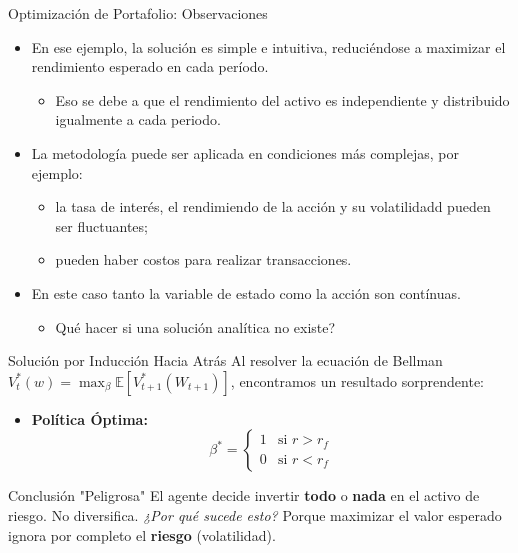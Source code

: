 \documentclass[xcolor=dvipsnames]{beamer}
\begin{document}
\begin{frame}{Optimización de Portafolio: Observaciones}
\begin{itemize}
\item En ese ejemplo, la solución es simple e intuitiva, reduciéndose a maximizar el rendimiento esperado en cada período. 
\begin{itemize}
\item<2-> Eso se debe a que el rendimiento del activo es independiente y distribuido igualmente a cada periodo.
\end{itemize}
\item<3-> La metodología puede ser aplicada en condiciones más complejas, por ejemplo:
\begin{itemize} 
\item<4-> la tasa de interés, el rendimiendo de la acción y su volatilidadd pueden ser fluctuantes;
\item<5-> pueden haber costos para realizar transacciones.
\end{itemize}
\item<6-> En este caso tanto la variable de estado como la acción son contínuas.
\begin{itemize}
\item<7-> \textquestiondown Qu\'e hacer si una solución analítica no existe? 
\end{itemize}
\end{itemize}
\end{frame}

\begin{frame}{Soluci\'on por Inducci\'on Hacia Atr\'as}
Al resolver la ecuaci\'on de Bellman $V_t^*(w) = \max_{\beta} \mathbb{E}[V_{t+1}^*(W_{t+1})]$, encontramos un resultado sorprendente:

\begin{itemize}
    \item \textbf{Pol\'itica Óptima:} 
    \[ \beta^* = \begin{cases} 1 & \text{si } r > r_f \\ 0 & \text{si } r < r_f \end{cases} \]
\end{itemize}

\begin{alertblock}{Conclusi\'on "Peligrosa"}
    El agente decide invertir \textbf{todo} o \textbf{nada} en el activo de riesgo. No diversifica. 
    \textit{¿Por qu\'e sucede esto?} Porque maximizar el valor esperado ignora por completo el \textbf{riesgo} (volatilidad).
\end{alertblock}
\end{frame}
\end{document}

